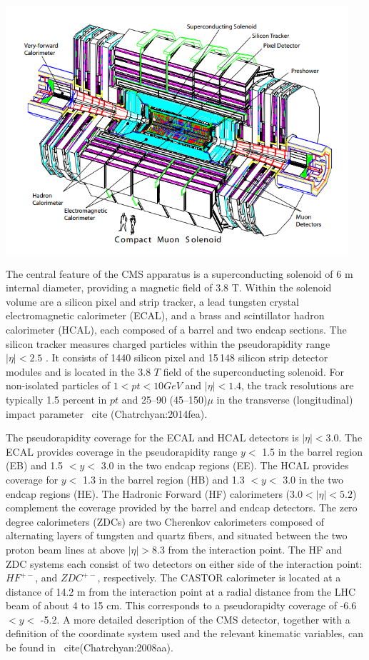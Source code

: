 \centerline{
\includegraphics[width=5in]{Chapter3/importfigs/fromCMS_DesignPaper_perspective.png}
}

The central feature of the CMS apparatus is a superconducting solenoid of 6 m internal diameter, providing a magnetic field of 3.8 T. Within the solenoid volume are a silicon pixel and strip tracker, a lead tungsten crystal electromagnetic calorimeter (ECAL), and a brass and scintillator hadron calorimeter (HCAL), each composed of a barrel and two endcap sections. The silicon tracker measures charged particles within the pseudorapidity range $|\eta| < 2.5$ . It consists of 1440 silicon pixel and 15\,148 silicon strip detector modules and is located in the 3.8 $T$ field of the superconducting solenoid. For non-isolated particles of $1 < pt < 10 GeV$ and $|\eta| < 1.4$, the track resolutions are typically 1.5 percent in $pt$ and 25--90 (45--150)$\mu$ in the transverse (longitudinal) impact parameter~ cite (Chatrchyan:2014fea). 


The pseudorapidity coverage for the ECAL and HCAL detectors is $|\eta|< 3.0$. The ECAL provides coverage in the pseudorapidity range $y < $ 1.5 in the barrel region (EB) and 1.5 $< y <$ 3.0 in the two endcap regions (EE). The HCAL provides coverage for $y <$ 1.3 in the barrel region (HB) and 1.3 $< y< $ 3.0 in the two endcap regions (HE). The Hadronic Forward (HF) calorimeters ($3.0<|\eta| < 5.2 $) complement the coverage provided by the barrel and endcap detectors. The zero degree calorimeters (ZDCs) are two Cherenkov calorimeters composed of alternating layers of tungsten and quartz fibers, and situated between the two proton beam lines at above $|\eta|>8.3$ from the interaction point. The HF and ZDC systems each consist of two detectors on either side of the interaction point: $HF^{+-}$, and $ZDC^{+-}$, respectively. The CASTOR calorimeter is located at a distance of 14.2 m from the interaction point at a radial distance from the LHC beam of about 4 to 15 cm. This corresponds to a pseudorapidty coverage of -6.6 $< y <$ -5.2. A more detailed description of the CMS detector, together with a definition of the coordinate system used and the relevant kinematic variables, can be found in~ cite(Chatrchyan:2008aa).

